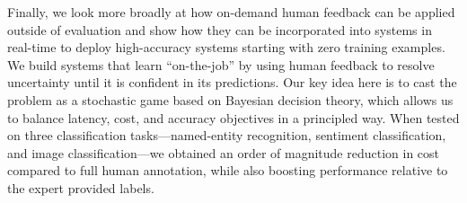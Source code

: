 Finally, we look more broadly at how on-demand human feedback can be applied outside of evaluation and show how they can be incorporated into systems in real-time to deploy high-accuracy systems starting with zero training examples.
We build systems that learn ``on-the-job'' by using human feedback to resolve uncertainty until it is confident in its predictions.
Our key idea here is to cast the problem as a stochastic game based on Bayesian decision theory, which allows us to balance latency, cost, and accuracy objectives in a principled way.
When tested on three classification tasks---named-entity recognition, sentiment classification, and image classification---we obtained an order of magnitude reduction in cost compared to full human annotation, while also boosting performance relative to the expert provided labels.
